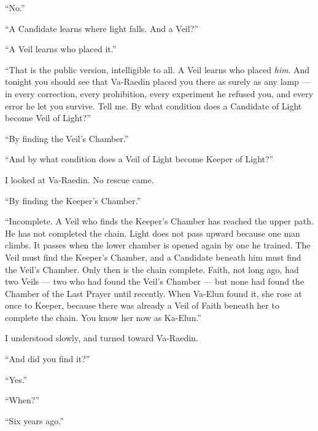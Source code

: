 ``No.''\par

``A Candidate learns where light falls. And a Veil?''\par

``A Veil learns who placed it.''\par

``That is the public version, intelligible to all. A Veil learns who placed \textit{him}.
And tonight you should see that Va-Raedin placed you there as surely as any lamp --- in every correction, every prohibition, every experiment he refused you, and every error he let you survive.
Tell me. By what condition does a Candidate of Light become Veil of Light?''\par

``By finding the Veil's Chamber.''\par

``And by what condition does a Veil of Light become Keeper of Light?''\par

I looked at Va-Raedin. No rescue came.\par

``By finding the Keeper's Chamber.''\par

``Incomplete.
A Veil who finds the Keeper's Chamber has reached the upper path. He has not completed the chain.
Light does not pass upward because one man climbs. It passes when the lower chamber is opened again by one he trained.
The Veil must find the Keeper's Chamber, and a Candidate beneath him must find the Veil's Chamber. Only then is the chain complete.
Faith, not long ago, had two Veils --- two who had found the Veil's Chamber --- but none had found the Chamber of the Last Prayer until recently.
When Va-Elun found it, she rose at once to Keeper, because there was already a Veil of Faith beneath her to complete the chain. You know her now as Ka-Elun.''\par

I understood slowly, and turned toward Va-Raedin.\par

``And did you find it?''\par

``Yes.''\par

``When?''\par

``Six years ago.''\par

